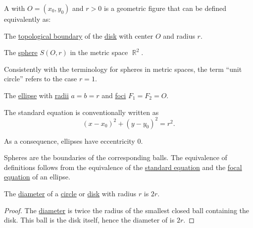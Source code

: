 \begin{definition}\label{def:circle}\mimprovised
  A  with  \( O = (x_0, y_0) \) and  \( r > 0 \) is a geometric figure that can be defined equivalently as:

  \begin{thmenum}[series=def:circle]
     The \hyperref[def:topological_boundary]{topological boundary} of the \hyperref[def:disk]{disk} with center \( O \) and radius \( r \).

     The \hyperref[def:metric_space/sphere]{sphere} \( S(O, r) \) in the metric space \( \BbbR^2 \).

    Consistently with the terminology for spheres in metric spaces, the term \enquote{unit circle} refers to the case \( r = 1 \).

     The \hyperref[def:ellipse]{ellipse} with \hyperref[def:ellipse]{radii} \( a = b = r \) and \hyperref[def:ellipse/foci]{foci} \( F_1 = F_2 = O \).

    The standard equation is conventionally written as
    \begin{equation}\label{eq:def:circle/ellipse/standard_equation}
      (x - x_0)^2 + (y - y_0)^2 = r^2.
    \end{equation}

    As a consequence, ellipses have eccentricity \( 0 \).
  \end{thmenum}
\end{definition}
\begin{defproof}
   Spheres are the boundaries of the corresponding balls.
   The equivalence of definitions follows from the equivalence of the \hyperref[def:ellipse/focal_equation]{standard equation} and the \hyperref[def:ellipse/focal_equation]{focal equation} of an ellipse.
\end{defproof}

\begin{proposition}\label{thm:circle_diameter}
  The \hyperref[def:metric_space/diameter]{diameter} of a \hyperref[def:circle]{circle} or \hyperref[def:disk]{disk} with radius \( r \) is \( 2r \).
\end{proposition}
\begin{proof}
  The \hyperref[def:metric_space/diameter]{diameter} is twice the radius of the smallest closed ball containing the disk. This ball is the disk itself, hence the diameter of is \( 2r \).
\end{proof}

